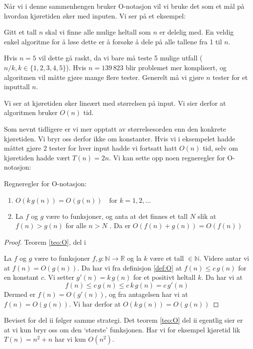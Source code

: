 Når vi i denne sammenhengen bruker O-notasjon vil vi bruke det som et mål på hvordan kjøretiden øker med inputen. Vi ser på et eksempel:

\begin{eks}
Gitt et tall $ n $ skal vi finne alle mulige heltall som $ n $ er delelig med. En veldig enkel algoritme for å løse dette er å forsøke å dele på alle tallene fra 1 til $ n $. 

Hvis $ n=5 $ vil dette gå raskt, da vi bare må teste 5 mulige utfall ($ n/k, k \in \{1, 2, 3, 4, 5\} $). Hvis $ n=139\,823 $ blir problemet mer komplisert, og algoritmen vil måtte gjøre mange flere tester. Generelt må vi gjøre $ n $ tester for et inputtall $ n $.

Vi ser at kjøretiden øker lineært med størrelsen på input. Vi sier derfor at algoritmen bruker $ O(n) $ tid.
\end{eks}

Som nevnt tidligere er vi mer opptatt av størrelsesorden enn den konkrete kjøretiden. Vi bryr oss derfor ikke om konstanter. Hvis vi i eksempelet hadde måttet gjøre 2 tester for hver input hadde vi fortsatt hatt $ O(n) $ tid, selv om kjøretiden hadde vært $ T(n) = 2n $. Vi kan sette opp noen regneregler for O-notasjon:
\begin{teorem}
\label{teo:O}
Regneregler for O-notasjon:
\begin{enumerate}[i]
\item $ O(k\,g(n)) = O(g(n)) \quad \text{for } k = 1,2,... $
\item La $ f $ og $ g $ være to funksjoner, og anta at det finnes et tall $ N $ slik at $ f(n) > g(n) $ for alle $ n > N$ . Da er $ O(f(n)+g(n)) = O(f(n)) $
\end{enumerate}
\end{teorem}

\begin{proof} Teorem \ref{teo:O}, del i

La $ f $ og $ g $ være to funksjoner $ f,g:\mathbb{N}\rightarrow\mathbb{R} $ og la $ k $ være et tall $ \in \mathbb{N} $. Videre antar vi at $ f(n) = O(g(n)) $. Da har vi fra definisjon \ref{def:O} at $ f(n) \leq c\,g(n) $ for en konstant $ c $. Vi setter $ g'(n) = k\,g(n) $ for et positivt heltall $ k $. Da har vi at
\[ f(n) \leq c\,g(n) \leq c\,k\,g(n) = c\,g'(n) \]
Dermed er $ f(n) = O(g'(n)) $, og fra antagelsen har vi at $ f(n) = O(g(n)) $. Vi har derfor at $ O(k\,g(n)) = O(g(n)) $
\end{proof}

Beviset for del ii følger samme strategi. Det teorem \ref{teo:O} del ii egentlig sier er at vi kun bryr oss om den `største' funksjonen. Har vi for eksempel kjøretid lik $ T(n) = n^2 + n $ har vi kun $ O(n^2) $.

